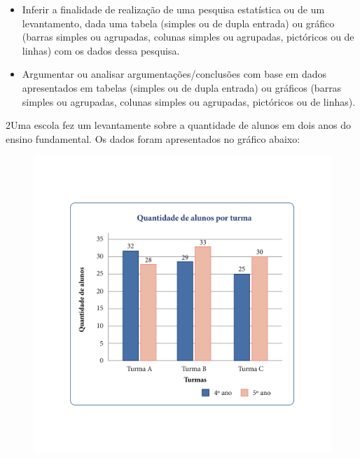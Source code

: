 
\begin{itemize}
\item Inferir a finalidade de realização de uma pesquisa estatística ou de
um levantamento, dada uma tabela (simples ou de dupla entrada) ou
gráfico (barras simples ou agrupadas, colunas simples ou agrupadas,
pictóricos ou de linhas) com os dados dessa pesquisa.

\item Argumentar ou analisar argumentações/conclusões com base em dados
apresentados em tabelas (simples ou de dupla entrada) ou gráficos
(barras simples ou agrupadas, colunas simples ou agrupadas, pictóricos
ou de linhas).
\end{itemize}


\num{2}Uma escola fez um levantamente sobre a quantidade de alunos em dois
anos do ensino fundamental. Os dados foram apresentados no gráfico
abaixo:

\begin{figure}[htpb!]
\includegraphics[width=\textwidth]{../ilustracoes/MAT5/SAEB_5ANO_MAT_figura110.png}
\end{figure}

